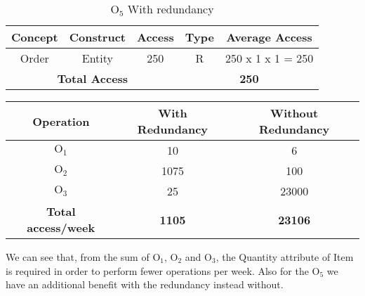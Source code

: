 \begin{table}[!h]\caption{	$ \textrm{O}_\textrm{5} $ With redundancy }
	\begin{center}
		\begin{tabular}{| c | c | c | c | c |}
			\hline
			\textbf{Concept} & \textbf{Construct} & \textbf{Access} & \textbf{Type} & \textbf{Average Access} \\ \hline
			Order & Entity & 250 & R & 250 x 1 x 1 = 250 \\ \hline
			\multicolumn{3}{|c|}{\textbf{Total Access}} & \multicolumn{2}{|c|}{\textbf{250}} \\ \hline
		\end{tabular}
	\end{center}
\end{table}
\begin{table}[!h]
	\begin{center}
		\begin{tabular}{ | c | c | c | }
			\hline
			\textbf{Operation} & \textbf{With Redundancy} & \textbf{Without Redundancy} \\ \hline
			$ \textrm{O}_\textrm{1} $ & 10 & 6\\ \hline
			$ \textrm{O}_\textrm{2} $ & 1075 & 100 \\ \hline
			$ \textrm{O}_\textrm{3} $ & 25 & 23000 \\\hline
			\textbf{Total access/week } & 	\textbf{1105} &	\textbf{23106} \\\hline
		\end{tabular}
	\end{center}
\end{table}

We can see that, from the sum of $ \textrm{O}_\textrm{1}$, $ \textrm{O}_\textrm{2}$ and $ \textrm{O}_\textrm{3}$, the Quantity attribute of Item is required in order to perform fewer operations per week. Also for the $ \textrm{O}_\textrm{5}$ we have an additional benefit with the redundancy instead without.
